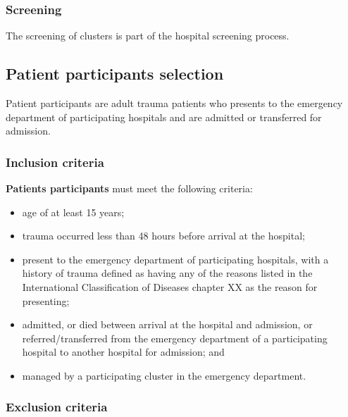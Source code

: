 \documentclass[
]{scrartcl}
\providecommand{\tightlist}{%
  \setlength{\itemsep}{0pt}\setlength{\parskip}{0pt}}\usepackage{longtable,booktabs,array}
\begin{document}
\hypertarget{screening-1}{%
\subsubsection{Screening}\label{screening-1}}

The screening of clusters is part of the hospital screening process.

\hypertarget{patient-participants-selection}{%
\subsection{Patient participants
selection}\label{patient-participants-selection}}

Patient participants are adult trauma patients who presents to the
emergency department of participating hospitals and are admitted or
transferred for admission.

\hypertarget{inclusion-criteria-1}{%
\subsubsection{Inclusion criteria}\label{inclusion-criteria-1}}

\textbf{Patients participants} must meet the following criteria:

\begin{itemize}
\tightlist
\item
  age of at least 15 years;
\item
  trauma occurred less than 48 hours before arrival at the hospital;
\item
  present to the emergency department of participating hospitals, with a
  history of trauma defined as having any of the reasons listed in the
  International Classification of Diseases chapter XX as the reason for
  presenting;
\item
  admitted, or died between arrival at the hospital and admission, or
  referred/transferred from the emergency department of a participating
  hospital to another hospital for admission; and
\item
  managed by a participating cluster in the emergency department.
\end{itemize}

\hypertarget{exclusion-criteria-1}{%
\subsubsection{Exclusion criteria}\label{exclusion-criteria-1}}
\end{document}
